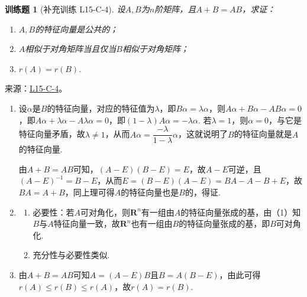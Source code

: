 \documentclass[UTF8,12pt,a4paper,fontset=fandol]{ctexart}
\newtheorem{exercise}{训练题}[section]
\begin{document}
\begin{exercise}[补充训练 L15-C-4]\label{prob:L15-C-4}
设$A,B$为$n$阶矩阵，且$A+B=AB$，求证：
        \begin{enumerate}
            \item $A,B$的特征向量是公共的；

            \item $A$相似于对角矩阵当且仅当$B$相似于对角矩阵；

            \item $r(A)=r(B)$.
        \end{enumerate}
\end{exercise}
\noindent 来源：\href{https://github.com/yhwu-is/Linear-Algebra-Left-Undone/blob/new/%E8%AE%B2%E4%B9%89/%E4%B8%93%E9%A2%98/15%20%E7%9B%B8%E4%BC%BC%E6%A0%87%E5%87%86%E5%BD%A2%EF%BC%9A%E5%A4%8D%E6%95%B0%E5%9F%9F%E4%B8%8A%E7%9A%84%E5%B0%9D%E8%AF%95%E4%B8%8E%E7%90%86%E8%AE%BA.tex}{L15-C-4}。
\begin{solve}
\begin{enumerate}
                \item 设$\alpha$是$B$的特征向量，对应的特征值为$\lambda$，即$B\alpha=\lambda\alpha$，则$A\alpha+B\alpha-AB\alpha=0$，即$A\alpha+\lambda\alpha-A\lambda\alpha=0$，即$(1-\lambda)A\alpha=-\lambda\alpha$. 若$\lambda=1$，则$\alpha=0$，与它是特征向量矛盾，故$\lambda\neq 1$，从而$A\alpha=\dfrac{-\lambda}{1-\lambda}\alpha$，这就说明了$B$的特征向量就是$A$的特征向量.

                      由$A+B=AB$可知，$(A-E)(B-E)=E$，故$A-E$可逆，且$(A-E)^{-1}=B-E$，从而$E=(B-E)(A-E)=BA-A-B+E$，故$BA=A+B$，同上理可得$A$的特征向量也是$B$的，得证.

                \item \begin{enumerate}
                          \item 必要性：若$A$可对角化，则$\mathbf{R}^n$有一组由$A$的特征向量张成的基，由（1）知$B$与$A$特征向量一致，故$\mathbf{R}^n$也有一组由$B$的特征向量张成的基，即$B$可对角化.

                          \item 充分性与必要性类似.
                      \end{enumerate}

                \item 由$A+B=AB$可知$A=(A-E)B$且$B=A(B-E)$，由此可得$r(A)\leqslant r(B)\leqslant r(A)$，故$r(A)=r(B)$.
            \end{enumerate}
\end{solve}
\end{document}
